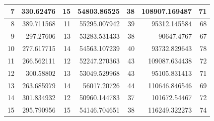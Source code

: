 \begin{table}
\begin{adjustwidth}{}{}
{{\begin{tabular}{|r|r|r|r|r|r|r|}
					\hline
					7                                          & 330.62476                    & 15                                    & 54803.86525                    & 38                                    & 108907.169487                & 71                                     \\ 
					\hline
					8                                          & 389.711568                   & 11                                    & 55295.007942                   & 39                                    & 95312.145584                 & 68                                     \\ 
					\hline
					9                                          & 297.27606                    & 13                                    & 53283.531433                   & 38                                    & 90647.4767                   & 67                                     \\ 
					\hline
					10                                         & 277.617715                   & 14                                    & 54563.107239                   & 40                                    & 93732.829643                 & 78                                     \\ 
					\hline
					11                                         & 266.562111                   & 12                                    & 52247.270363                   & 43                                    & 109087.634438                & 72                                     \\ 
					\hline
					12                                         & 300.58802                    & 13                                    & 53049.529968                   & 43                                    & 95105.831413                 & 71                                     \\ 
					\hline
					13                                         & 263.685979                   & 14                                    & 56017.20726                    & 44                                    & 110646.846546                & 69                                     \\ 
					\hline
					14                                         & 301.834932                   & 12                                    & 50960.144783                   & 37                                    & 101672.54467                 & 72                                     \\ 
					\hline
					15                                         & 295.790956                   & 15                                    & 54146.704651                   & 38                                    & 116249.322273                & 74                                     \\ 

\end{tabular}}}
\end{adjustwidth}
\end{table}

